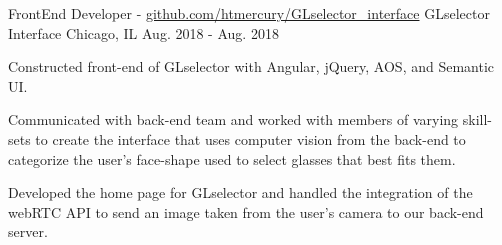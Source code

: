 

\begin{cventries}

  \cventry
    {FrontEnd Developer - \href{https://github.com/htmercury/GLselector_interface}{github.com/htmercury/GLselector\_interface}} %
    {GLselector Interface} %
    {Chicago, IL} %
    {Aug. 2018 - Aug. 2018} %
    {
      \begin{cvitems} %
        \item {Constructed front-end of GLselector with Angular, jQuery, AOS, and Semantic UI.}
        \item {Communicated with back-end team and worked with members of varying skill-sets to create the interface that uses computer vision from the back-end to categorize the user's face-shape used to select glasses that best fits them.}
        \item {Developed the home page for GLselector and handled the integration of the webRTC API to send an image taken from the user's camera to our back-end server.}
      \end{cvitems}
     }

\end{cventries}